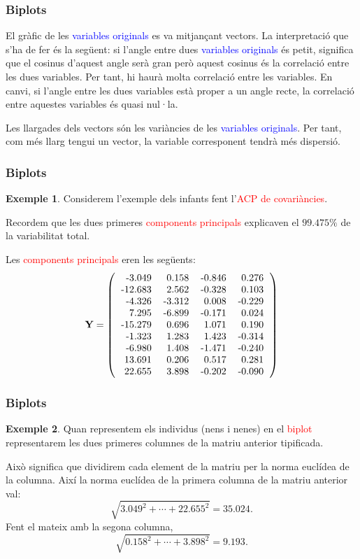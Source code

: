 \documentclass[12pt,t]{beamer}
\newcommand{\red}[1]{\textcolor{red}{#1}}
\newcommand{\blue}[1]{\textcolor{blue}{#1}}
\theoremstyle{plain}
\theoremstyle{definition}
\newtheorem{exemple}{Exemple}
\begin{document}
\begin{frame}
\frametitle{Biplots}
El gràfic de les \blue{variables originals} es va mitjançant vectors. La interpretació que s'ha de fer és la següent: si l'angle entre dues \blue{variables originals} és petit, significa que el cosinus d'aquest angle serà gran però aquest cosinus és la correlació entre les dues variables. Per tant, hi haurà molta correlació entre les variables. En canvi, si l'angle entre les dues variables està proper a un angle recte, la correlació entre aquestes variables és quasi nul·la.
\medskip

Les llargades dels vectors són les variàncies de les \blue{variables originals}. Per tant, com més llarg tengui un vector, la variable corresponent tendrà més dispersió.
\end{frame}



\begin{frame}
\frametitle{Biplots}
\begin{exemple}
Considerem l'exemple dels infants fent l'\red{ACP de covariàncies}.

Recordem que les dues primeres \red{components principals} explicaven el $99.475\%$ de la variabilitat total.

Les \red{components principals} eren les següents:
{\footnotesize
\[
\mathbf{Y}=
\left(
\begin{tabular}{rrrr}
  -3.049 & 0.158 & -0.846 & 0.276 \\ 
  -12.683 & 2.562 & -0.328 & 0.103 \\ 
  -4.326 & -3.312 & 0.008 & -0.229 \\ 
  7.295 & -6.899 & -0.171 & 0.024 \\ 
  -15.279 & 0.696 & 1.071 & 0.190 \\ 
  -1.323 & 1.283 & 1.423 & -0.314 \\ 
  -6.980 & 1.408 & -1.471 & -0.240 \\ 
  13.691 & 0.206 & 0.517 & 0.281 \\ 
  22.655 & 3.898 & -0.202 & -0.090 \\ 
  \end{tabular}\right)
\]
}
\end{exemple}
\end{frame}


\begin{frame}
\frametitle{Biplots}
\begin{exemple}
Quan representem els individus (nens i nenes) en el \red{biplot} representarem les dues primeres columnes de la matriu anterior tipificada. 

Això significa que dividirem cada element de la matriu per la norma euclídea de la columna. Així la norma euclídea de la primera columna de la matriu anterior val:
\[
\sqrt{3.049^2+\cdots+22.655^2}=35.024.
\]
Fent el mateix amb la segona columna,
\[
\sqrt{0.158^2+\cdots+3.898^2}=9.193.
\]
\end{exemple}
\end{frame}
\end{document}
